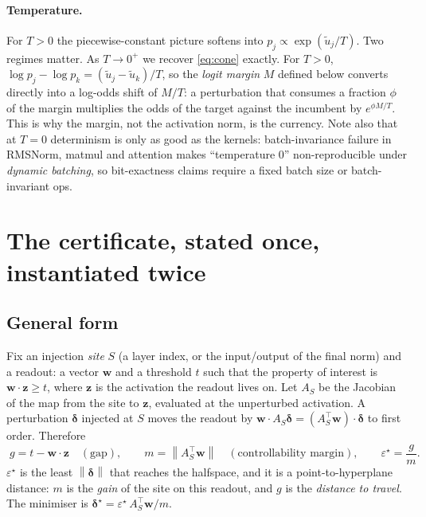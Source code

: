 \documentclass[11pt]{article}
\newcommand{\vz}{\bm{z}}
\newcommand{\vw}{\bm{w}}
\newcommand{\vd}{\bm{\delta}}
\newcommand{\norm}[1]{\left\lVert #1 \right\rVert}
\begin{document}
\paragraph{Temperature.} For $T > 0$ the piecewise-constant picture softens into
$p_j \propto \exp(\tilde u_j / T)$. Two regimes matter. As $T \to 0^+$ we recover
\eqref{eq:cone} exactly. For $T > 0$, $\log p_j - \log p_k = (\tilde u_j - \tilde
u_k)/T$, so the \emph{logit margin} $M$ defined below converts directly into a
log-odds shift of $M/T$: a perturbation that consumes a fraction $\phi$ of the margin
multiplies the odds of the target against the incumbent by $e^{\phi M / T}$. This is
why the margin, not the activation norm, is the currency. Note also that at $T=0$
determinism is only as good as the kernels: batch-invariance failure in RMSNorm,
matmul and attention makes ``temperature 0'' non-reproducible under \emph{dynamic
batching}, so bit-exactness claims require a fixed batch size or batch-invariant ops.

\section{The certificate, stated once, instantiated twice}

\subsection{General form}

Fix an injection \emph{site} $S$ (a layer index, or the input/output of the final
norm) and a readout: a vector $\vw$ and a threshold $t$ such that the property of
interest is $\vw \cdot \vz \ge t$, where $\vz$ is the activation the readout lives on.
Let $A_S$ be the Jacobian of the map from the site to $\vz$, evaluated at the
unperturbed activation. A perturbation $\vd$ injected at $S$ moves the readout by
$\vw \cdot A_S \vd = (A_S^{\!\top}\vw)\cdot\vd$ to first order. Therefore
\begin{equation}
  \boxed{\;
  g = t - \vw\cdot\vz \quad(\text{gap}), \qquad
  m = \norm{A_S^{\!\top}\vw} \quad(\text{controllability margin}), \qquad
  \varepsilon^\star = \frac{g}{m}. \;}
  \label{eq:cert}
\end{equation}
$\varepsilon^\star$ is the least $\norm{\vd}$ that reaches the halfspace, and it is a
point-to-hyperplane distance: $m$ is the \emph{gain} of the site on this readout, and
$g$ is the \emph{distance to travel}. The minimiser is
$\vd^\star = \varepsilon^\star\, A_S^{\!\top}\vw / m$.
\end{document}
